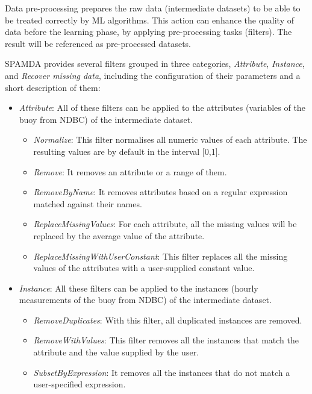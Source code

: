 \documentclass[energies,article,accept,moreauthors,pdftex]{Definitions/mdpi}
\begin{document}
\begin{paracol}{2}
				Data pre-processing prepares the raw data (intermediate datasets) to be able to be treated correctly by ML algorithms. This action can enhance the quality of data before the learning phase, by applying pre-processing tasks (filters). The result will be referenced as pre-processed datasets.
				
				SPAMDA provides several filters grouped in three categories, \textit{Attribute}, \textit{Instance}, and \textit{Recover missing data}, including the configuration of their parameters and a short description of them:
				\begin{itemize}

				 \item \textit{Attribute}: All of these filters can be applied to the attributes (variables of the buoy from NDBC) of the intermediate dataset.
				 
					\begin{itemize}
						\item \textit{Normalize}: This filter normalises all numeric values of each attribute. The resulting values are by default in the interval [0,1].
						\item \textit{Remove}: It removes an attribute or a range of them.
						\item \textit{RemoveByName}: It removes attributes based on a regular expression matched against their names.
						\item \textit{ReplaceMissingValues}: For each attribute, all the missing values will be replaced by the average value of the attribute.
						\item \textit{ReplaceMissingWithUserConstant}: This filter replaces all the missing values of the attributes with a user-supplied constant value.
					\end{itemize}
				 
				 \item \textit{Instance}: All these filters can be applied to the instances (hourly measurements of the buoy from NDBC) of the intermediate dataset.
					\begin{itemize}
						\item \textit{RemoveDuplicates}: With this filter, all duplicated instances are removed.
						\item \textit{RemoveWithValues}: This filter removes all the instances that match the attribute and the value supplied by the user.
						\item \textit{SubsetByExpression}: It removes all the instances that do not match a user-specified expression.
					\end{itemize}
				 

\end{itemize}
\end{paracol}
\end{document}
